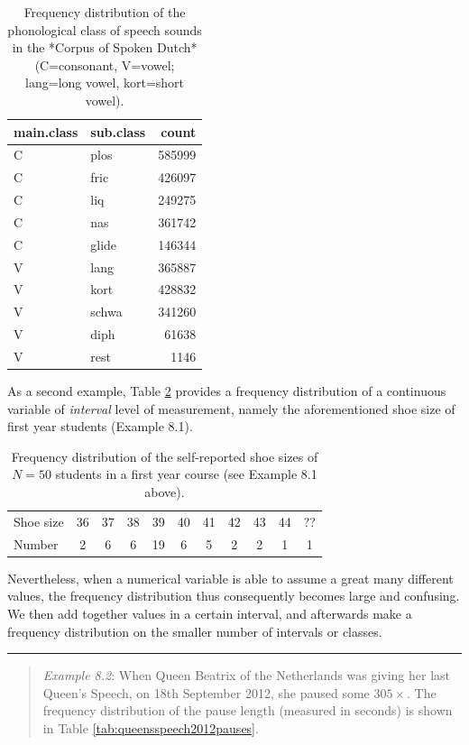 \documentclass[
]{book}
\begin{document}
\begin{table}

\caption{\label{tab:klankfreq}Frequency distribution 
              of the phonological class of speech sounds
              in the *Corpus of Spoken Dutch* 
              (C=consonant, V=vowel; lang=long vowel, kort=short vowel).}
\centering
\begin{tabular}[t]{llr}
\toprule
main.class & sub.class & count\\
\midrule
C & plos & 585999\\
C & fric & 426097\\
C & liq & 249275\\
C & nas & 361742\\
C & glide & 146344\\
\addlinespace
V & lang & 365887\\
V & kort & 428832\\
V & schwa & 341260\\
V & diph & 61638\\
V & rest & 1146\\
\bottomrule
\end{tabular}
\end{table}

As a second example, Table \ref{tab:shoesize} provides a
frequency distribution of a continuous variable of \emph{interval}
level of measurement, namely the aforementioned shoe size
of first year students (Example 8.1).

\begin{longtable}[]{@{}lcccccccccc@{}}
\caption{\label{tab:shoesize} Frequency distribution of the self-reported shoe sizes of \(N=50\) students in a first year course (see Example 8.1 above).}\tabularnewline
\toprule
\endhead
Shoe size & 36 & 37 & 38 & 39 & 40 & 41 & 42 & 43 & 44 & ??\tabularnewline
Number & 2 & 6 & 6 & 19 & 6 & 5 & 2 & 2 & 1 & 1\tabularnewline
\bottomrule
\end{longtable}

Nevertheless, when a numerical variable is able to assume a great many different
values, the frequency distribution thus consequently becomes large and confusing.
We then add together values in a certain interval,
and afterwards make a frequency distribution on the smaller number
of intervals or classes.

\begin{center}\rule{0.5\linewidth}{0.5pt}\end{center}

\begin{quote}
\emph{Example 8.2}: When Queen Beatrix of the Netherlands was giving her last Queen's Speech,
on 18th September 2012, she paused some \(305\times\). The frequency distribution
of the pause length (measured in seconds) is shown in
Table \ref{tab:queensspeech2012pauses}.
\end{quote}
\end{document}
